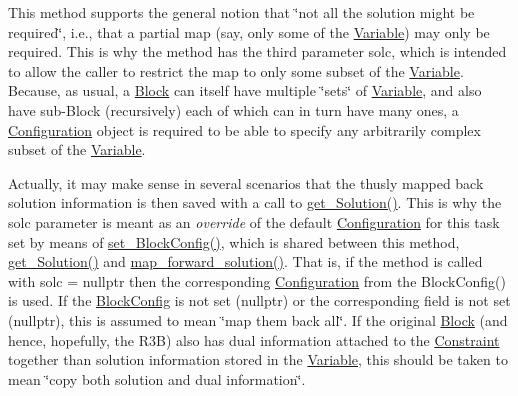 This method supports the general notion that \char`\"{}not all the solution might
be required\char`\"{}, i.\+e., that a partial map (say, only some of the \mbox{\hyperlink{class_s_m_spp__di__unipi__it_1_1_variable}{Variable}}) may only be required. This is why the method has the third parameter solc, which is intended to allow the caller to restrict the map to only some subset of the \mbox{\hyperlink{class_s_m_spp__di__unipi__it_1_1_variable}{Variable}}. Because, as usual, a \mbox{\hyperlink{class_s_m_spp__di__unipi__it_1_1_block}{Block}} can itself have multiple \char`\"{}sets\char`\"{} of \mbox{\hyperlink{class_s_m_spp__di__unipi__it_1_1_variable}{Variable}}, and also have sub-\/\+Block (recursively) each of which can in turn have many ones, a \mbox{\hyperlink{class_s_m_spp__di__unipi__it_1_1_configuration}{Configuration}} object is required to be able to specify any arbitrarily complex subset of the \mbox{\hyperlink{class_s_m_spp__di__unipi__it_1_1_variable}{Variable}}.

Actually, it may make sense in several scenarios that the thusly mapped back solution information is then saved with a call to \mbox{\hyperlink{class_s_m_spp__di__unipi__it_1_1_block_a1db67c2f65111af4314e79dfc81ba597}{get\+\_\+\+Solution()}}. This is why the solc parameter is meant as an {\itshape override} of the default \mbox{\hyperlink{class_s_m_spp__di__unipi__it_1_1_configuration}{Configuration}} for this task set by means of \mbox{\hyperlink{class_s_m_spp__di__unipi__it_1_1_block_a18d411b740a47db00d15083c5c7ef2ba}{set\+\_\+\+Block\+Config()}}, which is shared between this method, \mbox{\hyperlink{class_s_m_spp__di__unipi__it_1_1_block_a1db67c2f65111af4314e79dfc81ba597}{get\+\_\+\+Solution()}} and \mbox{\hyperlink{class_s_m_spp__di__unipi__it_1_1_block_a7759467d70613a10c1cdb5d3193b4434}{map\+\_\+forward\+\_\+solution()}}. That is, if the method is called with solc = nullptr then the corresponding \mbox{\hyperlink{class_s_m_spp__di__unipi__it_1_1_configuration}{Configuration}} from the Block\+Config() is used. If the \mbox{\hyperlink{class_s_m_spp__di__unipi__it_1_1_block_config}{Block\+Config}} is not set (nullptr) or the corresponding field is not set (nullptr), this is assumed to mean \char`\"{}map them back all\char`\"{}. If the original \mbox{\hyperlink{class_s_m_spp__di__unipi__it_1_1_block}{Block}} (and hence, hopefully, the R3B) also has dual information attached to the \mbox{\hyperlink{class_s_m_spp__di__unipi__it_1_1_constraint}{Constraint}} together than solution information stored in the \mbox{\hyperlink{class_s_m_spp__di__unipi__it_1_1_variable}{Variable}}, this should be taken to mean \char`\"{}copy both solution and dual
information\char`\"{}.

